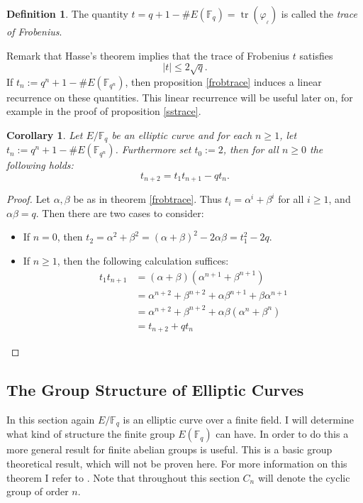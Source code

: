 \documentclass{article}
\numberwithin{equation}{section}
\newtheorem{corollary}[theorem]{Corollary}
\theoremstyle{definition}
\newtheorem{definition}[theorem]{Definition}
\newcommand{\FF}[1]{{\mathbb F}_{#1}} %
\newcommand{\frob}[1][]{\varphi_{#1}} %
\newcommand{\tr}[1]{\operatorname{tr} \left(#1\right)} %
\begin{document}
\begin{definition}\label{trace}
The quantity $t=q+1-\#E(\FF{q})=\tr{\frob_\ell}$ is called the \emph{trace of Frobenius}.
\end{definition}

Remark that Hasse's theorem implies that the trace of Frobenius $t$ satisfies $$|t| \leq 2\sqrt{q}.$$ If $t_n:=q^n+1-\#E(\FF{q^n})$, then proposition \ref{frobtrace} induces a linear recurrence on these quantities. This linear recurrence will be useful later on, for example in the proof of proposition \ref{sstrace}. 

\begin{corollary}\label{tracesrecursion}
Let $E/\FF{q}$ be an elliptic curve and for each $n \geq 1$, let $t_n:=q^n+1-\#E(\FF{q^n})$. Furthermore set $t_0:=2$, then for all $n\geq0$ the following holds: $$t_{n+2}=t_1t_{n+1}-qt_n.$$ 
\end{corollary}

\begin{proof}
Let $\alpha,\beta$ be as in theorem \ref{frobtrace}. Thus $t_i=\alpha^i+\beta^i$ for all $i\geq 1$, and $\alpha\beta=q$. Then there are two cases to consider:
\begin{itemize}
\item If $n=0$, then $t_2=\alpha^2+\beta^2=(\alpha+\beta)^2-2\alpha\beta=t_1^2-2q$.
\item If $n\geq 1$, then the following calculation suffices: \begin{align*}
t_1t_{n+1} &= (\alpha+\beta)(\alpha^{n+1}+\beta^{n+1})\\
&= \alpha^{n+2}+\beta^{n+2} + \alpha\beta^{n+1}+\beta\alpha^{n+1}\\
&= \alpha^{n+2}+\beta^{n+2} + \alpha\beta(\alpha^n+\beta^n)\\
&= t_{n+2}+qt_n
\end{align*}
\end{itemize} 
\end{proof}




\subsection{The Group Structure of Elliptic Curves}
In this section again $E/\FF{q}$ is an elliptic curve over a finite field. I will determine what kind of structure the finite group $E(\FF{q})$ can have. In order to do this a more general result for finite abelian groups is useful. This is a basic group theoretical result, which will not be proven here. For more information on this theorem I refer to \cite{Abeliangrps}. Note that throughout this section $C_n$ will denote the cyclic group of order $n$.
\end{document}
